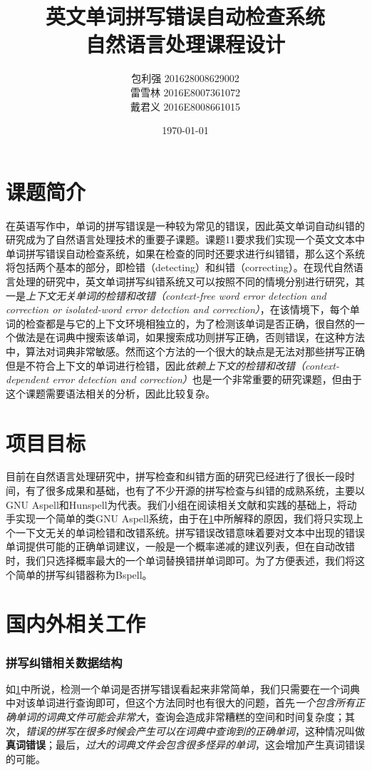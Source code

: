 \documentclass[UTF8,a4paper]{ctexart}
\title{英文单词拼写错误自动检查系统 \\
\Large 自然语言处理课程设计}
\author{包利强 201628008629002 \\
雷雪林 2016E8007361072 \\
戴君义 2016E8008661015}
\date{\today}
\begin{document}
\maketitle
\tableofcontents

\clearpage
\section{课题简介}
\label{intro}
在英语写作中，单词的拼写错误是一种较为常见的错误，因此英文单词自动纠错的研究成为了自然语言处理技术的重要子课题。课题11要求我们实现一个英文文本中单词拼写错误自动检查系统，如果在检查的同时还要求进行纠错错，那么这个系统将包括两个基本的部分，即检错（detecting）和纠错（correcting）。在现代自然语言处理的研究中，英文单词拼写纠错系统又可以按照不同的情境分别进行研究，其一是\textit{上下文无关单词的检错和改错（context-free word error detection and correction or isolated-word error detection and correction）}，在该情境下，每个单词的检查都是与它的上下文环境相独立的，为了检测该单词是否正确，很自然的一个做法是在词典中搜索该单词，如果搜索成功则拼写正确，否则错误，在这种方法中，算法对词典非常敏感。然而这个方法的一个很大的缺点是无法对那些拼写正确但是不符合上下文的单词进行检错，因此\textit{依赖上下文的检错和改错（context-dependent error detection and correction）}也是一个非常重要的研究课题，但由于这个课题需要语法相关的分析，因此比较复杂\cite{deorowicz2005correcting}。

\section{项目目标}
\label{target}
目前在自然语言处理研究中，拼写检查和纠错方面的研究已经进行了很长一段时间，有了很多成果和基础，也有了不少开源的拼写检查与纠错的成熟系统，主要以GNU Aspell和Hunspell为代表。我们小组在阅读相关文献和实践的基础上，将动手实现一个简单的类GNU Aspell\cite{atkinson2011gnu}系统，由于在\ref{intro}中所解释的原因，我们将只实现上个一下文无关的单词检错和改错系统。拼写错误改错意味着要对文本中出现的错误单词提供可能的正确单词建议，一般是一个概率递减的建议列表，但在自动改错时，我们只选择概率最大的一个单词替换错拼单词即可。为了方便表述，我们将这个简单的拼写纠错器称为Bspell。

\section{国内外相关工作}
\label{related}

\subsubsection{拼写纠错相关数据结构}
\label{detection}
如\ref{intro}中所说，检测一个单词是否拼写错误看起来非常简单，我们只需要在一个词典中对该单词进行查询即可，但这个方法同时也有很大的问题，首先\textit{一个包含所有正确单词的词典文件可能会非常大}，查询会造成非常糟糕的空间和时间复杂度；其次，\textit{错误的拼写在很多时候会产生可以在词典中查询到的正确单词}，这种情况叫做\textbf{真词错误}；最后，\textit{过大的词典文件会包含很多怪异的单词}，这会增加产生真词错误的可能。
\end{document}
